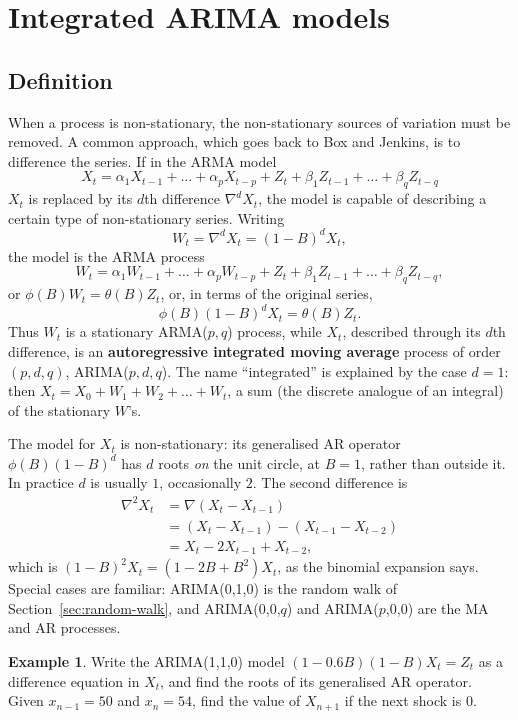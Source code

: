 \documentclass[11pt,a4paper]{article}
\theoremstyle{definition}
\newtheorem{exa}[thm]{Example}
\begin{document}
\section{Integrated ARIMA models}\label{sec:integrated}
\subsection{Definition}
When a process is non-stationary, the non-stationary sources of variation must be removed. A common
approach, which goes back to Box and Jenkins, is to difference the series. If in the ARMA model
\[
X_t = \alpha_1X_{t-1} + \dots + \alpha_pX_{t-p} + Z_t + \beta_1Z_{t-1} + \dots + \beta_qZ_{t-q}
\]
$X_t$ is replaced by its $d$th difference $\nabla^dX_t$, the model is capable of describing a certain type of non-stationary
series. Writing
\[
W_t = \nabla^dX_t = (1 - B)^dX_t ,
\]
the model is the ARMA process
\[
W_t = \alpha_1W_{t-1} + \dots + \alpha_pW_{t-p} + Z_t + \beta_1Z_{t-1} + \dots + \beta_qZ_{t-q} ,
\]
or $\phi(B)W_t = \theta(B)Z_t$,
or, in terms of the original series,
\[
\phi(B)(1 - B)^dX_t = \theta(B)Z_t .
\]
Thus $W_t$ is a stationary ARMA($p, q$) process, while $X_t$, described through its $d$th difference, is an \textbf{autoregressive
integrated moving average} process of order $(p, d, q)$, ARIMA($p, d, q$). The name ``integrated'' is explained by the
case $d = 1$: then $X_t = X_0 + W_1 + W_2 + \dots + W_t$, a sum (the discrete analogue of an integral) of the stationary $W$'s.

The model for $X_t$ is non-stationary: its generalised AR operator $\phi(B)(1 - B)^d$ has $d$ roots \emph{on} the unit circle, at
$B = 1$, rather than outside it. In practice $d$ is usually $1$, occasionally $2$. The second difference is
\begin{align*}
\nabla^2X_t &= \nabla(X_t - X_{t-1}) \\
&= (X_t - X_{t-1}) - (X_{t-1} - X_{t-2}) \\
&= X_t - 2X_{t-1} + X_{t-2} ,
\end{align*}
which is $(1 - B)^2X_t = (1 - 2B + B^2)X_t$, as the binomial expansion says. Special cases are familiar: ARIMA(0,1,0) is the
random walk of Section~\ref{sec:random-walk}, and ARIMA(0,0,$q$) and ARIMA($p$,0,0) are the MA and AR processes.

\begin{exa}\label{exa:arima110}
Write the ARIMA(1,1,0) model $(1 - 0.6B)(1 - B)X_t = Z_t$ as a difference equation in $X_t$, and find the roots of its
generalised AR operator. Given $x_{n-1} = 50$ and $x_n = 54$, find the value of $X_{n+1}$ if the next shock is $0$.
\end{exa}
\end{document}
